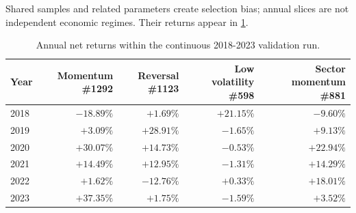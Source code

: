 Shared samples and related parameters create selection bias; annual slices
are not independent economic regimes. Their returns appear in
\cref{tab:annual-folds}.

\begin{table}[H]
\centering
\begin{threeparttable}
\small
\begin{tabular}{@{}lrrrr@{}}
\toprule
Year & Momentum \#1292 & Reversal \#1123 & Low volatility \#598 & Sector momentum \#881\\
\midrule
2018 & $-18.89\%$ & $+1.69\%$ & $+21.15\%$ & $-9.60\%$\\
2019 & $+3.09\%$ & $+28.91\%$ & $-1.65\%$ & $+9.13\%$\\
2020 & $+30.07\%$ & $+14.73\%$ & $-0.53\%$ & $+22.94\%$\\
2021 & $+14.49\%$ & $+12.95\%$ & $-1.31\%$ & $+14.29\%$\\
2022 & $+1.62\%$ & $-12.76\%$ & $+0.33\%$ & $+18.01\%$\\
2023 & $+37.35\%$ & $+1.75\%$ & $-1.59\%$ & $+3.52\%$\\
\bottomrule
\end{tabular}
\caption[Annual validation returns, 2018-2023]{Annual net returns within the continuous 2018-2023 validation run.}
\label{tab:annual-folds}
\end{threeparttable}
\end{table}
\FloatBarrier
